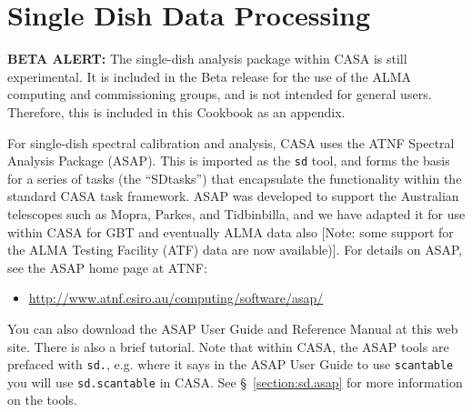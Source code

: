 

\chapter[Appendix: Single Dish Data Processing]{Single Dish Data Processing}
\label{chapter:sd}



{\bf BETA ALERT:} The single-dish analysis package within CASA
is still experimental.
It is included in the Beta release for the use
of the ALMA computing and commissioning groups, and is not intended
for general users.  Therefore, this is included in this Cookbook
as an appendix.

For single-dish spectral calibration and analysis, 
CASA uses the ATNF Spectral Analysis Package (ASAP).  This is
imported as the {\tt sd} tool, and forms the basis for a series
of tasks (the ``SDtasks'') that encapsulate the functionality
within the standard CASA task framework.  ASAP was developed to
support the Australian telescopes such as Mopra, Parkes, and
Tidbinbilla, and we have adapted it for use within CASA for
GBT and eventually ALMA data also [Note: some support for the ALMA Testing
Facility (ATF) data are now available)].  For details on ASAP, see
the ASAP home page at ATNF: 
\begin{itemize}
   \item \url{http://www.atnf.csiro.au/computing/software/asap/}
\end{itemize}
You can also download the ASAP User Guide and Reference Manual at this
web site.  There is also a brief tutorial.  Note that within CASA,
the ASAP tools are prefaced with {\tt sd.}, e.g. where it
says in the ASAP User Guide to use {\tt scantable} you will use
{\tt sd.scantable} in CASA.  See \S~\ref{section:sd.asap} for more
information on the tools.


